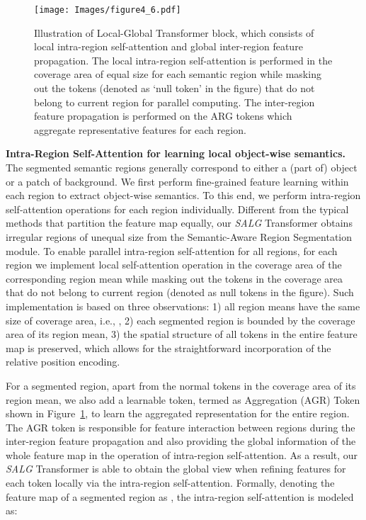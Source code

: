 \begin{figure}[!t]
\centering
\texttt{[image: Images/figure4\_6.pdf]}
\caption{Illustration of Local-Global Transformer block, which consists of local intra-region self-attention and global inter-region feature propagation. The local intra-region self-attention is performed in the coverage area of equal size for each semantic region while masking out the tokens (denoted as `null token' in the figure) that do not belong to current region for parallel computing. The inter-region feature propagation is performed on the ARG tokens which aggregate representative features for each region.}
\label{fig:local-global}
\end{figure}

\smallskip\noindent\textbf{Intra-Region Self-Attention for learning local object-wise semantics.}
The segmented semantic regions generally correspond to either a (part of) object or a patch of background. We first perform fine-grained feature learning within each region to extract object-wise semantics. To this end, we perform intra-region self-attention operations for each region individually. Different from the typical methods that partition the feature map equally, our \emph{SALG} Transformer obtains irregular regions of unequal size from the Semantic-Aware Region Segmentation module. To enable parallel intra-region self-attention for all regions, for each region we implement local self-attention operation in the coverage area of the corresponding region mean while masking out the tokens in the coverage area that do not belong to current region (denoted as null tokens in the figure). Such implementation is based on three observations: 1) all region means have the same size of coverage area, i.e., , 2) each segmented region is bounded by the coverage area of its region mean, 3) the spatial structure of all tokens in the entire feature map is preserved, which allows for the straightforward incorporation of the relative position encoding.

For a segmented region, apart from the normal tokens in the coverage area of its region mean, we also add a learnable token, termed as Aggregation (AGR) Token shown in Figure~\ref{fig:local-global}, to learn the aggregated representation for the entire region. The AGR token is responsible for feature interaction between regions during the inter-region feature propagation and also providing the global information of the whole feature map in the operation of intra-region self-attention. As a result, our \emph{SALG} Transformer is able to obtain the global view when refining features for each token locally via the intra-region self-attention. Formally, denoting the feature map of a segmented region  as , the intra-region self-attention is modeled as:

